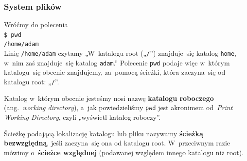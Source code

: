 \documentclass[10pt,t]{beamer}
\begin{document}









\begin{frame}
  \frametitle{System plików}


  Wróćmy do polecenia \\
  \texttt{\$ pwd} \\
  \texttt{/home/adam} \\
  Linię \texttt{/home/adam} czytamy „W~katalogu root („\texttt{/}”)
  znajduje~się katalog \texttt{home}, w~nim zaś znajduje~się katalog
  \texttt{adam}.” Polecenie \texttt{pwd} podaje więc w~którym katalogu~się
  obecnie znajdujemy, za~pomocą ścieżki, która zaczyna~się od katalogu root:
  „\texttt{/}”.

  Katalog w~którym obecnie jesteśmy nosi nazwę \textbf{katalogu roboczego}
  (ang.~\textit{working directory}), a~jak powiedzieliśmy \texttt{pwd} jest
  akronimem od~\textit{Print Working Directory}, czyli „wyświetl katalog
  roboczy”.

  Ścieżkę podającą lokalizację katalogu lub pliku nazywamy
  \textbf{ścieżką bezwzględną}, jeśli zaczyna~się ona od katalogu root.
  W~przeciwnym razie mówimy o~\textbf{ścieżce względnej} (podawanej
  względem innego katalogu niż root).

\end{frame}
\end{document}
